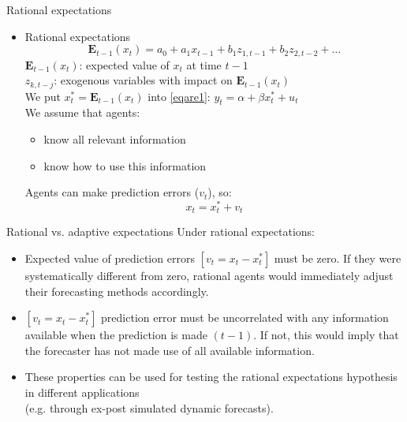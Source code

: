\documentclass{beamer}
\begin{document}
\begin{frame}{Rational expectations}
\begin{itemize}
\item Rational expectations
$$\mathbf{E}_{t-1}(x_t)=a_0+a_1 x_{t-1} + b_1 z_{1,t-1}+b_2 z_{2, t-2}+\dots$$
$\mathbf{E}_{t-1}(x_t)$: expected value of $x_t$ at time $t-1$\\
$z_{k,t-j}$: exogenous variables with impact on $\mathbf{E}_{t-1}(x_t)$\\
\vspace{0.3cm}
We put $x_t^\ast = \mathbf{E}_{t-1}(x_t)$ into \eqref{eqare1}: $y_t = \alpha + \beta x_t^\ast + u_t$\\
\vspace{0.3cm}
We assume that agents:
\begin{itemize}
\item know all relevant information
\item know how to use this information
\end{itemize}
\vspace{0.3cm}
Agents can make prediction errors ($v_t$), so: $$x_t=x^\ast_t+v_t $$
\end{itemize}
\end{frame}


\begin{frame}{Rational vs. adaptive expectations}
Under rational expectations:
\vspace{0.3cm}
\begin{itemize}
\item Expected value of  prediction errors $[v_t = x_t - x^\ast_t]$ must be zero. If they were systematically different from zero, rational agents would immediately adjust their forecasting methods accordingly.
\vspace{0.3cm}
\item $[v_t = x_t - x^\ast_t]$ prediction error must be uncorrelated with any information available when the prediction is made $(t-1)$. If not, this would imply that the forecaster has not made use of all available information.
\vspace{0.3cm}
\item These properties can be used for testing the rational expectations hypothesis in different applications \\(e.g. through ex-post simulated dynamic forecasts).
\end{itemize}
\end{frame}
\end{document}
